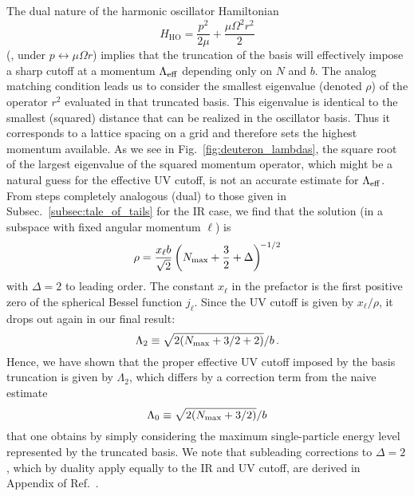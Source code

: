 	The dual nature of the harmonic oscillator Hamiltonian
	\begin{equation}
	 H_\mathrm{HO} = \frac{p^2}{2\mu} + \frac{\mu\Omega^2r^2}{2}
	\label{eq:H-HO}
	\end{equation}
	(\ie, under $p \leftrightarrow \mu\Omega r$) implies that the
	truncation of the basis will effectively impose a sharp cutoff at a
	momentum $\Lambda_{\rm eff}$ depending only on $N$ and $b$.  The analog matching
	condition leads us to consider the smallest eigenvalue (denoted $\rho$) of
	the operator $r^2$ evaluated in that truncated basis.  This eigenvalue is
	identical to the smallest (squared) distance that can be realized in the
	oscillator basis.  Thus it corresponds to a lattice spacing on a grid
	and therefore sets the highest momentum available.  As we see
	in Fig.~\ref{fig:deuteron_lambdas}, the square root of the largest
	eigenvalue of the squared momentum operator, which might be a natural guess
	for the effective UV cutoff, is not an accurate estimate for $\Lambda_{\rm eff}$.
	From steps completely analogous (dual) to those given in
	Subsec.~\ref{subsec:tale_of_tails} for the IR case, we find that
	the solution (in a subspace with fixed angular momentum $\ell$) is
	\begin{equation}
	\rho = \frac{x_\ell b}{\sqrt2}\left({N_{\mathrm{max}}}+\frac32+\Delta\right)^{\!-1/2}
	\label{eq:rho-Nmax-Delta}
	\end{equation}
	with $\Delta=2$ to leading order.  The constant $x_\ell$ in the prefactor is
	the first positive zero of the spherical Bessel function $j_\ell$.  Since the
	UV cutoff is given by $x_\ell/\rho$, it drops out again in our final
	result:
	\begin{equation}
	\Lambda_2 \equiv \sqrt{2({N_{\mathrm{max}}}+3/2+2)}/b \,.
	\label{eq:Lambda-2-simple}
	\end{equation}
	Hence, we have shown that the proper effective UV cutoff imposed by
	the basis truncation is given by $\Lambda_2$, which differs by a correction
	term from the naive estimate
	\begin{equation}
	 \Lambda_0 \equiv \sqrt{2({N_{\mathrm{max}}}+3/2)}/b
	\label{eq:Lambda-0}
	\end{equation}
	that one obtains by simply considering the maximum single-particle energy
	level represented by the truncated basis.  We note that subleading
	corrections	to $\Delta=2$, which by duality apply equally to the IR and UV
	cutoff, are	derived in Appendix of Ref.~\cite{Konig:2014hma}.

